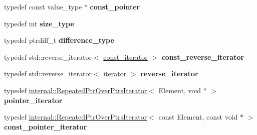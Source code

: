 \begin{DoxyCompactItemize}
\item 
\mbox{\label{classgoogle_1_1protobuf_1_1RepeatedPtrField_ae896bc1a20cb37cdd11e76272e7a696a}} 
typedef const value\+\_\+type $\ast$ {\bfseries const\+\_\+pointer}
\item 
\mbox{\label{classgoogle_1_1protobuf_1_1RepeatedPtrField_a7890884cc752b986c9674263f1fb89f2}} 
typedef int {\bfseries size\+\_\+type}
\item 
\mbox{\label{classgoogle_1_1protobuf_1_1RepeatedPtrField_a94f7bc34ad1579983fd2144260142a1d}} 
typedef ptrdiff\+\_\+t {\bfseries difference\+\_\+type}
\item 
\mbox{\label{classgoogle_1_1protobuf_1_1RepeatedPtrField_a0555c6763199953172d50e300e183a2b}} 
typedef std\+::reverse\+\_\+iterator$<$ \hyperlink{classgoogle_1_1protobuf_1_1internal_1_1RepeatedPtrIterator}{const\+\_\+iterator} $>$ {\bfseries const\+\_\+reverse\+\_\+iterator}
\item 
\mbox{\label{classgoogle_1_1protobuf_1_1RepeatedPtrField_a23d0621f584daefcde383265252bf8e5}} 
typedef std\+::reverse\+\_\+iterator$<$ \hyperlink{classgoogle_1_1protobuf_1_1internal_1_1RepeatedPtrIterator}{iterator} $>$ {\bfseries reverse\+\_\+iterator}
\item 
\mbox{\label{classgoogle_1_1protobuf_1_1RepeatedPtrField_adf877398b773ca6b0426f7a6df2b2d28}} 
typedef \hyperlink{classgoogle_1_1protobuf_1_1internal_1_1RepeatedPtrOverPtrsIterator}{internal\+::\+Repeated\+Ptr\+Over\+Ptrs\+Iterator}$<$ Element, void $\ast$ $>$ {\bfseries pointer\+\_\+iterator}
\item 
\mbox{\label{classgoogle_1_1protobuf_1_1RepeatedPtrField_a9f916c9e947e7a63c9f485f230fc1715}} 
typedef \hyperlink{classgoogle_1_1protobuf_1_1internal_1_1RepeatedPtrOverPtrsIterator}{internal\+::\+Repeated\+Ptr\+Over\+Ptrs\+Iterator}$<$ const Element, const void $\ast$ $>$ {\bfseries const\+\_\+pointer\+\_\+iterator}
\item 
\mbox{\label{classgoogle_1_1protobuf_1_1RepeatedPtrField_a2846efabf8fd8831c5af4fdfa0325c85}} 

\end{DoxyCompactItemize}
